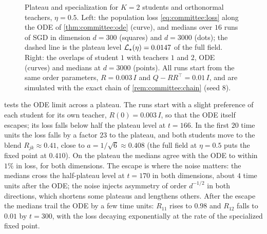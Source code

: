 \begin{refsection}
\begin{figure}[t]
\centering
{}
\caption{Plateau and specialization for $K=2$ students and orthonormal teachers, $\eta=0.5$. Left: the population loss \eqref{eq:committee:loss} along the ODE of \cref{thm:committee:ode} (curve), and medians over $16$ runs of SGD in dimension $d=300$ (squares) and $d=3000$ (dots); the dashed line is the plateau level $\mathcal{L}_\star(\eta)=0.0147$ of the full field. Right: the overlaps of student $1$ with teachers $1$ and $2$, ODE (curves) and medians at $d=3000$ (points). All runs start from the same order parameters, $R=0.003\,I$ and $Q-RR^\top=0.01\,I$, and are simulated with the exact chain of \cref{rem:committee:chain} (seed $8$).}\label{fig:committee:plateau}
\end{figure}

 tests the ODE limit across a plateau. The runs start with a slight preference of each student for its own teacher, $R(0)=0.003\,I$, so that the ODE itself escapes; its loss falls below half the plateau level at $t=166$. In the first $20$ time units the loss falls by a factor $23$ to the plateau, and both students move to the blend $R_{jk}\approx0.41$, close to $a=1/\sqrt6\approx0.408$ (the full field at $\eta=0.5$ puts the fixed point at $0.410$). On the plateau the medians agree with the ODE to within $1\%$ in loss, for both dimensions. The escape is where the noise matters: the medians cross the half-plateau level at $t=170$ in both dimensions, about $4$ time units after the ODE; the noise injects asymmetry of order $d^{-1/2}$ in both directions, which shortens some plateaus and lengthens others. After the escape the medians trail the ODE by a few time units: $R_{11}$ rises to $0.98$ and $R_{12}$ falls to $0.01$ by $t=300$, with the loss decaying exponentially at the rate of the specialized fixed point.


\end{refsection}
